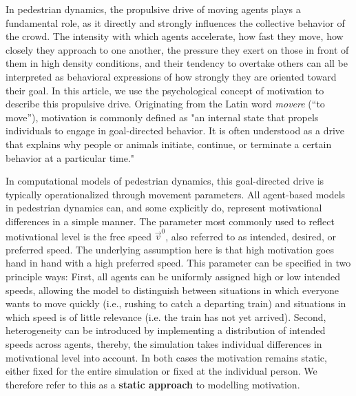\documentclass[pdflatex,sn-mathphys-num]{sn-jnl}%
\theoremstyle{thmstyleone}%
\theoremstyle{thmstyletwo}%
\theoremstyle{thmstylethree}%
\begin{document}
In pedestrian dynamics, the propulsive drive of moving agents plays a fundamental role, as it directly and strongly influences the collective behavior of the crowd. The intensity with which agents accelerate, how fast they move, how closely they approach to one another, the pressure they exert on those in front of them in high density conditions, and their tendency to overtake others can all be interpreted as behavioral expressions of how strongly they are oriented toward their goal. In this article, we use the psychological concept of motivation to describe this propulsive drive. Originating from the Latin word \textit{movere} (“to move”), motivation is commonly defined as "an internal state that propels individuals to engage in goal-directed behavior. It is often understood as a drive that explains why people or animals initiate, continue, or terminate a certain behavior at a particular time." %


In computational models of pedestrian dynamics, this goal-directed drive is typically operationalized through movement parameters. All agent-based models in pedestrian dynamics can, and some explicitly do, represent motivational differences in a simple manner. The parameter most commonly used to reflect motivational level is the free speed $\vec{v}^0$, also referred to as intended, desired, or preferred speed. The underlying assumption here is that high motivation goes hand in hand with a high preferred speed. This parameter can be specified in two principle ways: First, all agents can be uniformly assigned high or low intended speeds, allowing the model to distinguish between situations in which everyone wants to move quickly (i.e., rushing to catch a departing train) and situations in which speed is of little relevance (i.e. the train has not yet arrived). Second, heterogeneity can be introduced by implementing a distribution of intended speeds across agents, thereby, the simulation takes individual differences in motivational level into account. In both cases the motivation remains static, either fixed for the entire simulation or fixed at the individual person. We therefore refer to this as a \textbf{static approach} to modelling motivation.
\end{document}
